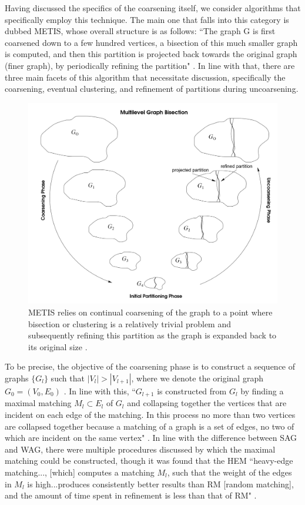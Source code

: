 \documentclass{article}
\begin{document}
Having discussed the specifics of the coarsening itself, we consider algorithms that specifically employ this technique. The main one that falls into this category is dubbed METIS, whose overall structure is as follows: ``The graph G is first coarsened down to a few hundred vertices, a bisection of this much smaller graph is computed, and then this partition is projected back towards the original graph (finer graph), by periodically refining the partition" \cite{metis}. In line with that, there are three main facets of this algorithm that necessitate discussion, specifically the coarsening, eventual clustering, and refinement of partitions during uncoarsening.

\begin{figure}
    \centering
    \includegraphics[width=.75\textwidth]{metis.png}
    \caption[METIS Architecture]{METIS relies on continual coarsening of the graph to a point where bisection or clustering is a relatively trivial problem and subsequently refining this partition as the graph is expanded back to its original size \cite{metis}.}
    \label{fig:metis}
\end{figure}

To be precise, the objective of the coarsening phase is to construct a sequence of graphs $\{G_{l}\}$ such that $|V_{l}| > |V_{l+1}|$, where we denote the original graph $G_{0}=(V_0,E_0)$ \cite{metis}. In line with this, ``$G_{l+1}$ is constructed from $G_l$ by finding a maximal matching $M_l\subset E_l$ of $G_l$ and collapsing together the vertices that are incident on each edge of the matching. In this process no more than two vertices are collapsed together because a matching of a graph is a set of edges, no two of which are incident on the same vertex" \cite{metis}. In line with the difference between SAG and WAG, there were multiple procedures discussed by which the maximal matching could be constructed, though it was found that the HEM ``heavy-edge matching..., [which] computes a matching $M_l$, such that the weight of the edges in $M_l$ is high...produces consistently better results than RM [random matching], and the amount of time spent in refinement is less than that of RM" \cite{metis}.
\end{document}
